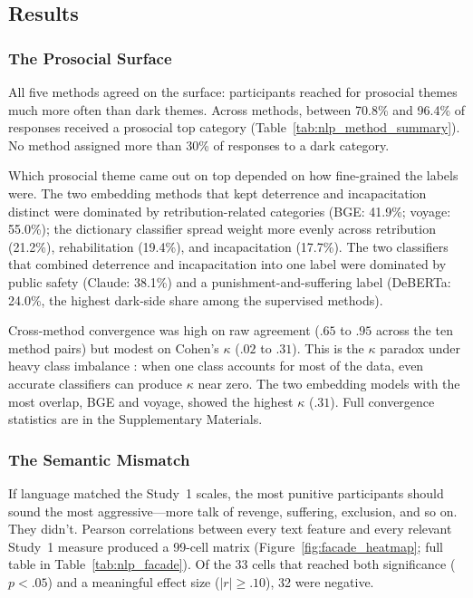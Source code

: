 \subsection{Results}

\subsubsection{The Prosocial Surface}

All five methods agreed on the surface: participants reached for prosocial themes much more often than dark themes. Across methods, between 70.8\% and 96.4\% of responses received a prosocial top category (Table~\ref{tab:nlp_method_summary}). No method assigned more than 30\% of responses to a dark category.

Which prosocial theme came out on top depended on how fine-grained the labels were. The two embedding methods that kept deterrence and incapacitation distinct were dominated by retribution-related categories (BGE: 41.9\%; voyage: 55.0\%); the dictionary classifier spread weight more evenly across retribution (21.2\%), rehabilitation (19.4\%), and incapacitation (17.7\%). The two classifiers that combined deterrence and incapacitation into one label were dominated by public safety (Claude: 38.1\%) and a punishment-and-suffering label (DeBERTa: 24.0\%, the highest dark-side share among the supervised methods).

Cross-method convergence was high on raw agreement ($.65$ to $.95$ across the ten method pairs) but modest on Cohen's $\kappa$ ($.02$ to $.31$). This is the $\kappa$ paradox under heavy class imbalance \citep{feinstein1990high}: when one class accounts for most of the data, even accurate classifiers can produce $\kappa$ near zero. The two embedding models with the most overlap, BGE and voyage, showed the highest $\kappa$ ($.31$). Full convergence statistics are in the Supplementary Materials.

\subsubsection{The Semantic Mismatch}

If language matched the Study~1 scales, the most punitive participants should sound the most aggressive---more talk of revenge, suffering, exclusion, and so on. They didn't. Pearson correlations between every text feature and every relevant Study~1 measure produced a 99-cell matrix (Figure~\ref{fig:facade_heatmap}; full table in Table~\ref{tab:nlp_facade}). Of the 33 cells that reached both significance ($p < .05$) and a meaningful effect size ($|r| \geq .10$), 32 were negative.

